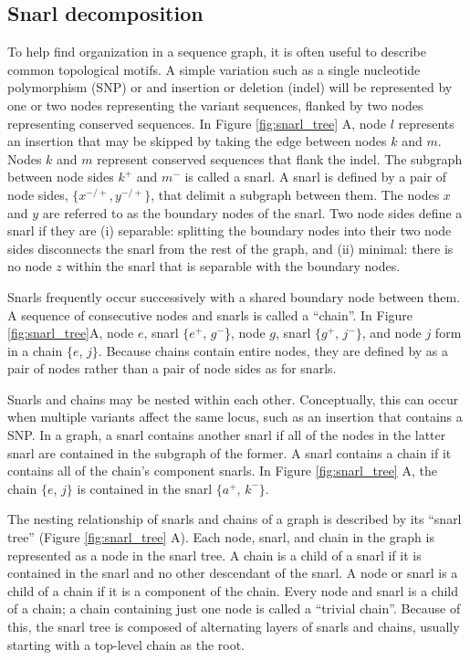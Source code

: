 \documentclass[11pt]{ucscthesis}
\begin{document}
\subsection{Snarl decomposition}

To help find organization in a sequence graph, it is often useful to describe common topological motifs.
A simple variation such as a single nucleotide polymorphism (SNP) or and insertion or deletion (indel) will be represented by one or two nodes representing the variant sequences, flanked by two nodes representing conserved sequences.
In Figure \ref{fig:snarl_tree} A, node $l$ represents an insertion that may be skipped by taking the edge between nodes $k$ and $m$.
Nodes $k$ and $m$ represent conserved sequences that flank the indel.
The subgraph between node sides $k^+$ and $m^-$ is called a snarl.
A snarl is defined by a pair of node sides, $\{x^{-/+}, y^{-/+}\}$, that delimit a subgraph between them.
The nodes $x$ and $y$ are referred to as the boundary nodes of the snarl.
Two node sides define a snarl if they are (i) separable: splitting the boundary nodes into their two node sides disconnects the snarl from the rest of the graph, and (ii) minimal: there is no node $z$ within the snarl that is separable with the boundary nodes.

Snarls frequently occur successively with a shared boundary node between them.
A sequence of consecutive nodes and snarls is called a ``chain''.
In Figure \ref{fig:snarl_tree}A, node $e$, snarl $\{e^+$, $g^-$\}, node $g$, snarl $\{g^+$, $j^-\}$, and node $j$ form in a chain $\{e$, $j\}$.
Because chains contain entire nodes, they are defined by as a pair of nodes rather than a pair of node sides as for snarls.

Snarls and chains may be nested within each other.
Conceptually, this can occur when multiple variants affect the same locus, such as an insertion that contains a SNP.
In a graph, a snarl contains another snarl if all of the nodes in the latter snarl are contained in the subgraph of the former.
A snarl contains a chain if it contains all of the chain's component snarls.
In Figure \ref{fig:snarl_tree} A, the chain $\{e$, $j\}$ is contained in the snarl $\{a^+$, $k^-\}$.

The nesting relationship of snarls and chains of a graph is described by its ``snarl tree'' (Figure \ref{fig:snarl_tree} A).
Each node, snarl, and chain in the graph is represented as a node in the snarl tree.
A chain is a child of a snarl if it is contained in the snarl and no other descendant of the snarl.
A node or snarl is a child of a chain if it is a component of the chain.
Every node and snarl is a child of a chain; a chain containing just one node is called a ``trivial chain''.
Because of this, the snarl tree is composed of alternating layers of snarls and chains, usually starting with a top-level chain as the root.
\end{document}
